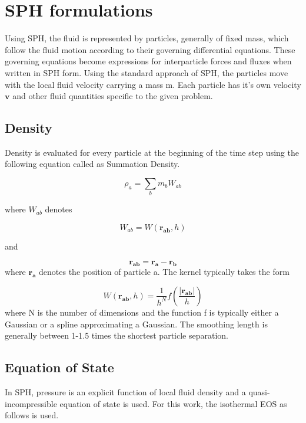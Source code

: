 \chapter{SPH formulations}

Using SPH, the fluid is represented by particles, generally of fixed mass, which follow the fluid motion according to their governing differential equations. These governing equations become expressions for interparticle forces and fluxes when written in SPH form. Using the standard approach of SPH, the particles move with the local fluid velocity carrying a mass m. Each particle has it's own velocity $\mathbf{v}$ and other fluid quantities specific to the given problem. 

\section{Density}

Density is evaluated for every particle at the beginning of the time step using the following equation called as Summation Density. 

\begin{equation}
 \rho_a = \sum_b m_b W_{ab}
\end{equation}

\noindent
where $W_{ab}$ denotes

\begin{equation}
 W_{ab} = W(\mathbf{r_{ab}}, h)
\end{equation}

\noindent
and

\begin{equation}
 \mathbf{r_{ab}} = \mathbf{r_a} - \mathbf{r_b}
\end{equation}
\noindent
where $\mathbf{r_a}$ denotes the position of particle a. The kernel typically takes the form

\begin{equation}
 W(\mathbf{r_{ab}}, h)= \frac{1}{h^N} f\left( \frac{\left|\mathbf{r_{ab}} \right|}{h}\right)
\end{equation}
\noindent
where N is the number of dimensions and the function f is typically either a Gaussian or a spline approximating a Gaussian. The smoothing length is generally between 1-1.5 times the shortest particle separation. 

\section{Equation of State}
In SPH, pressure is an explicit function of local fluid density and a quasi-incompressible equation of state is used. For this work, the isothermal EOS as follows is used.

